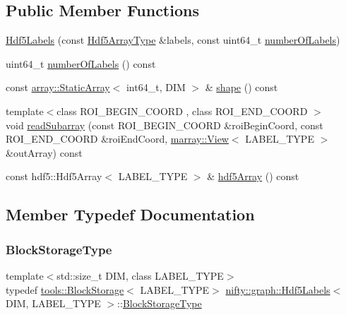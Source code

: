 \subsection*{Public Member Functions}
\begin{DoxyCompactItemize}
\item 
\hyperlink{classnifty_1_1graph_1_1Hdf5Labels_aeaa1ed4dc0066a4c0ee0d176a55c3dd3}{Hdf5\+Labels} (const \hyperlink{classnifty_1_1graph_1_1Hdf5Labels_a2cfeca010fa78ee8fdfa1767ae0fbe4a}{Hdf5\+Array\+Type} \&labels, const uint64\+\_\+t \hyperlink{classnifty_1_1graph_1_1Hdf5Labels_a63aff9c294ce5bf1ab1913a7e8bd09ef}{number\+Of\+Labels})
\item 
uint64\+\_\+t \hyperlink{classnifty_1_1graph_1_1Hdf5Labels_a63aff9c294ce5bf1ab1913a7e8bd09ef}{number\+Of\+Labels} () const
\item 
const \hyperlink{namespacenifty_1_1array_a683f151f19c851754e0c6d55ed16a0c2}{array\+::\+Static\+Array}$<$ int64\+\_\+t, D\+IM $>$ \& \hyperlink{classnifty_1_1graph_1_1Hdf5Labels_a5bc58e72f8e6dc4f015a6562f4bc58ed}{shape} () const
\item 
{\footnotesize template$<$class R\+O\+I\+\_\+\+B\+E\+G\+I\+N\+\_\+\+C\+O\+O\+RD , class R\+O\+I\+\_\+\+E\+N\+D\+\_\+\+C\+O\+O\+RD $>$ }\\void \hyperlink{classnifty_1_1graph_1_1Hdf5Labels_acee83d03d940eb4b5d0323b0eead3710}{read\+Subarray} (const R\+O\+I\+\_\+\+B\+E\+G\+I\+N\+\_\+\+C\+O\+O\+RD \&roi\+Begin\+Coord, const R\+O\+I\+\_\+\+E\+N\+D\+\_\+\+C\+O\+O\+RD \&roi\+End\+Coord, \hyperlink{classandres_1_1View}{marray\+::\+View}$<$ L\+A\+B\+E\+L\+\_\+\+T\+Y\+PE $>$ \&out\+Array) const
\item 
const hdf5\+::\+Hdf5\+Array$<$ L\+A\+B\+E\+L\+\_\+\+T\+Y\+PE $>$ \& \hyperlink{classnifty_1_1graph_1_1Hdf5Labels_a978766e66e04b140f29a7908b67cb1cb}{hdf5\+Array} () const
\end{DoxyCompactItemize}


\subsection{Member Typedef Documentation}
\mbox{\label{classnifty_1_1graph_1_1Hdf5Labels_abfffba953f16947d3907634b3aabdcad}} 
\subsubsection{\texorpdfstring{Block\+Storage\+Type}{BlockStorageType}}
{\footnotesize\ttfamily template$<$std\+::size\+\_\+t D\+IM, class L\+A\+B\+E\+L\+\_\+\+T\+Y\+PE$>$ \\
typedef \hyperlink{classnifty_1_1tools_1_1BlockStorage}{tools\+::\+Block\+Storage}$<$ L\+A\+B\+E\+L\+\_\+\+T\+Y\+PE$>$ \hyperlink{classnifty_1_1graph_1_1Hdf5Labels}{nifty\+::graph\+::\+Hdf5\+Labels}$<$ D\+IM, L\+A\+B\+E\+L\+\_\+\+T\+Y\+PE $>$\+::\hyperlink{classnifty_1_1graph_1_1Hdf5Labels_abfffba953f16947d3907634b3aabdcad}{Block\+Storage\+Type}}

